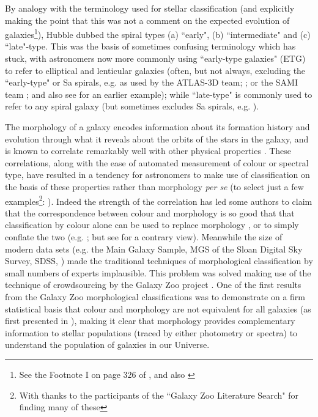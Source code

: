 \documentclass[usenatbib]{mn2e}
\begin{document}
By analogy with the terminology used for stellar classification (and explicitly making the point that this was not a comment on the expected evolution of galaxies\footnote{See the Footnote I on page 326 of \citet{Hubble1926}, and also \citet{Baldry2008AG}}), Hubble dubbed the spiral types (a) ``early",  (b) ``intermediate" and (c) ``late"-type. This was the basis of sometimes confusing terminology which has stuck, with astronomers now more commonly using ``early-type galaxies"  (ETG) to refer to elliptical and lenticular galaxies (often, but not always, excluding the ``early-type" or Sa spirals, e.g. as used by the ATLAS-3D team; \citealt{2011MNRAS.413..813C,2011MNRAS.416.1680C}; or the SAMI team \citealt{2018arXiv180711547F}; and also see \citealt{Stanford1998} for an earlier example); while ``late-type" is commonly used to refer to any spiral galaxy (but sometimes excludes Sa spirals, e.g. \citealt{Strateva2001}).

The morphology of a galaxy encodes information about its formation history and evolution through what it reveals about the orbits of the stars in the galaxy, and is known to correlate remarkably well with other physical properties \citep[e.g. star-formation rate, gas content, stellar mass][]{RobertsHaynes1994, Kennicutt1998, Strateva2001}. These correlations, along with the ease of automated measurement of colour or spectral type, have resulted in a tendency for astronomers to make use of classification on the basis of these properties rather than morphology {\it per se} (to select just a few examples\footnote{With thanks to the participants of the ``Galaxy Zoo Literature Search" for finding many of these}: \citealt{Bell2004, Weinmann2006, vandenBosch2008, Cooper2010, Zehavi2011}). Indeed the strength of the correlation has led some authors to claim that the correspondence between colour and morphology is so good that that classification by colour alone can be used to replace morphology \citep[e.g.][]{ParkChoi2005, Faber2007, AscasibarAlmeida2011}, or to simply conflate the two (e.g. \citealt{TalvanDokkum2011}; but see \citealt{vandenBergh2007} for a contrary view). Meanwhile the size of modern data sets (e.g. the Main Galaxy Sample, MGS of the Sloan Digital Sky Survey, SDSS, \citealt{Strauss2002}) made the traditional techniques of morphological classification by small numbers of experts implausible. This problem was solved making use of the technique of crowdsourcing by the Galaxy Zoo project \citep{Lintott2008,Lintott2011}. One of the first results from the Galaxy Zoo morphological classifications was to demonstrate on a firm statistical basis that colour and morphology are not equivalent for all galaxies (as first presented in \citealt{Bamford2009, Schawinski2009,Masters2010}), making it clear that morphology provides complementary information to stellar populations (traced by either photometry or spectra) to understand the population of galaxies in our Universe.   
\end{document}
